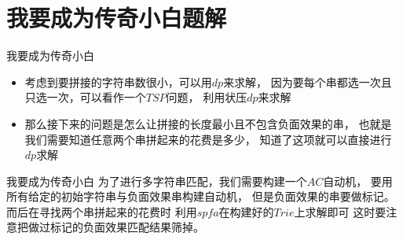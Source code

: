 \documentclass{beamer}
\begin{document}
\section{我要成为传奇小白题解}
\begin{frame} {我要成为传奇小白}
\begin{itemize}
  \item 考虑到要拼接的字符串数很小，可以用$dp$来求解，
  因为要每个串都选一次且只选一次，可以看作一个$TSP$问题，
  利用状压$dp$来求解
  \item 那么接下来的问题是怎么让拼接的长度最小且不包含负面效果的串，
  也就是我们需要知道任意两个串拼起来的花费是多少，
  知道了这项就可以直接进行$dp$求解
\end{itemize}
\end{frame}


\begin{frame} {我要成为传奇小白}
为了进行多字符串匹配，我们需要构建一个$AC$自动机，
要用所有给定的初始字符串与负面效果串构建自动机，
但是负面效果的串要做标记。而后在寻找两个串拼起来的花费时
利用$spfa$在构建好的$Trie$上求解即可
这时要注意把做过标记的负面效果匹配结果筛掉。
\end{frame}
\end{document}
